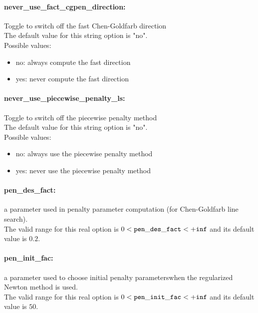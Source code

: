 \paragraph{never\_use\_fact\_cgpen\_direction:}\label{sec:never_use_fact_cgpen_direction} Toggle to switch off the fast Chen-Goldfarb direction $\;$ \\

The default value for this string option is "no".
\\ 
Possible values:
\begin{itemize}
   \item no: always compute the fast direction
   \item yes: never compute the fast direction
\end{itemize}

\paragraph{never\_use\_piecewise\_penalty\_ls:}\label{sec:never_use_piecewise_penalty_ls} Toggle to switch off the piecewise penalty method $\;$ \\

The default value for this string option is "no".
\\ 
Possible values:
\begin{itemize}
   \item no: always use the piecewise penalty method
   \item yes: never use the piecewise penalty method
\end{itemize}

\paragraph{pen\_des\_fact:}\label{sec:pen_des_fact} a parameter used in penalty parameter computation (for Chen-Goldfarb line search). $\;$ \\
 The valid range for this real option is 
$0 <  {\tt pen\_des\_fact } <  {\tt +inf}$
and its default value is $0.2$.


\paragraph{pen\_init\_fac:}\label{sec:pen_init_fac} a parameter used to choose initial penalty parameterswhen the regularized Newton method is used. $\;$ \\
 The valid range for this real option is 
$0 <  {\tt pen\_init\_fac } <  {\tt +inf}$
and its default value is $50$.


